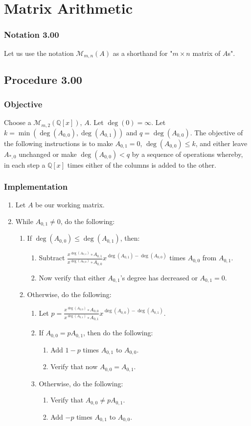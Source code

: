 \documentclass[twocolumn]{article}
\newcommand{\notation}[1]{\subsubsection*{Notation #1}}
\newcommand{\procedure}[2][]{\subsection*{Procedure #2 \ifthenelse{\equal{#1}{}}{}{(#1)}}\label{sec:procedure #2}}
\newcommand{\objective}{\subsubsection*{Objective}}
\newcommand{\implementation}{\subsubsection*{Implementation}}
\begin{document}
	\section{Matrix Arithmetic}
		\notation{3.00}
			Let us use the notation $\mathcal{M}_{m,n}(A)$ as a shorthand for "$m\times n$ matrix of $A$s".
		\procedure{3.00}
			\objective
				Choose a $\mathcal{M}_{m,2}(\mathbb{Q}[x])$, $A$. Let $\deg(0)=\infty$. Let $k=\min(\deg(A_{0,0}),\deg(A_{0,1}))$ and $q=\deg(A_{0,0})$. The objective of the following instructions is to make $A_{0,1}=0$, $\deg(A_{0,0})\le k$, and either leave $A_{*,0}$ unchanged or make $\deg(A_{0,0})<q$ by a sequence of operations whereby, in each step a $\mathbb{Q}[x]$ times either of the columns is added to the other.
			\implementation
				\begin{enumerate}
					\item Let $A$ be our working matrix.
					\item While $A_{0,1}\ne 0$, do the following:
					\begin{enumerate}
						\item If $\deg(A_{0,0})\le\deg(A_{0,1})$, then:
						\begin{enumerate}
							\item Subtract $\frac{x^{\deg(A_{0,1})}\circ A_{0,1}}{x^{\deg(A_{0,0})}\circ A_{0,0}}x^{\deg(A_{0,1})-\deg(A_{0,0})}$ times $A_{0,0}$ from $A_{0,1}$.
							\item Now verify that either $A_{0,1}$'s degree has decreased or $A_{0,1}=0$.
						\end{enumerate}
						\item Otherwise, do the following:
						\begin{enumerate}
							\item Let $p=\frac{x^{\deg(A_{0,0})}\circ A_{0,0}}{x^{\deg(A_{0,1})}\circ A_{0,1}}x^{\deg(A_{0,0})-\deg(A_{0,1})}$.
							\item If $A_{0,0}=pA_{0,1}$, then do the following:
							\begin{enumerate}
								\item Add $1-p$ times $A_{0,1}$ to $A_{0,0}$.
								\item Verify that now $A_{0,0}=A_{0,1}$.
							\end{enumerate}
							\item Otherwise, do the following:
							\begin{enumerate}
								\item Verify that $A_{0,0}\ne pA_{0,1}$.
								\item Add $-p$ times $A_{0,1}$ to $A_{0,0}$.

\end{enumerate}
\end{enumerate}
\end{enumerate}
\end{enumerate}
\end{document}
